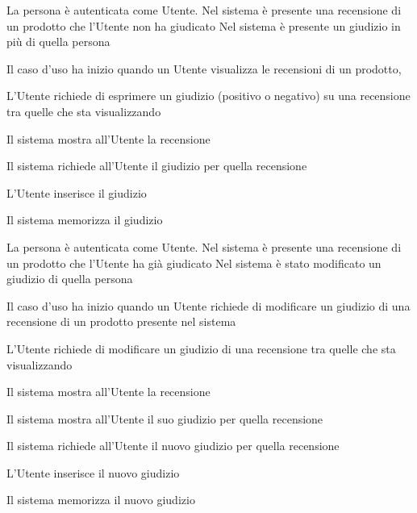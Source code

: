 {}
{La persona è autenticata come Utente. Nel sistema è presente una recensione di un prodotto che l'Utente non ha giudicato}
{Nel sistema è presente un giudizio in più di quella persona}
{\begin{enumCU}
	\item Il caso d'uso ha inizio quando un Utente visualizza le recensioni di un prodotto, 
	\item L'Utente richiede di esprimere un giudizio (positivo o negativo) su una recensione tra quelle che sta visualizzando
	\item Il sistema mostra all'Utente la recensione
	\item Il sistema richiede all'Utente il giudizio per quella recensione
	\item L'Utente inserisce il giudizio
	\item Il sistema memorizza il giudizio
\end{enumCU}}


{}
{La persona è autenticata come Utente. Nel sistema è presente una recensione di un prodotto che l'Utente ha già giudicato}
{Nel sistema è stato modificato un giudizio di quella persona}
{\begin{enumCU}
	\item Il caso d'uso ha inizio quando un Utente richiede di modificare un giudizio di una recensione di un prodotto presente nel sistema
	\item L'Utente richiede di modificare un giudizio di una recensione tra quelle che sta visualizzando
	\item Il sistema mostra all'Utente la recensione
	\item Il sistema mostra all'Utente il suo giudizio per quella recensione
	\item Il sistema richiede all'Utente il nuovo giudizio per quella recensione
	\item L'Utente inserisce il nuovo giudizio
	\item Il sistema memorizza il nuovo giudizio
\end{enumCU}}

\tabcuvspace

